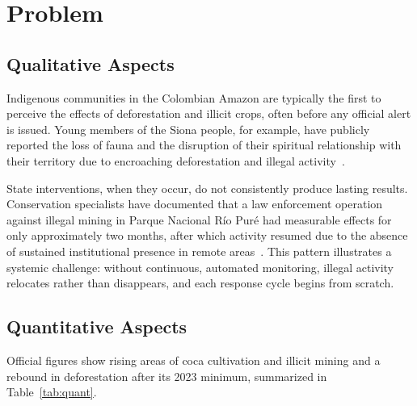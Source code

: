 \documentclass{article}
\begin{document}
\section{Problem}
\label{sec:problem}

\subsection{Qualitative Aspects}

Indigenous communities in the Colombian Amazon are typically the first to perceive
the effects of deforestation and illicit crops, often before any official alert
is issued.
Young members of the Siona people, for example, have publicly reported the loss
of fauna and the disruption of their spiritual relationship with their territory
due to encroaching deforestation and illegal activity~\cite{mongabay_siona2023}.

State interventions, when they occur, do not consistently produce lasting results.
Conservation specialists have documented that a law enforcement operation against
illegal mining in Parque Nacional Río Puré had measurable effects for only
approximately two months, after which activity resumed due to the absence of
sustained institutional presence in remote areas~\cite{mongabay_riopure2026}.
This pattern illustrates a systemic challenge: without continuous, automated
monitoring, illegal activity relocates rather than disappears, and each response
cycle begins from scratch.

\subsection{Quantitative Aspects}

Official figures show rising areas of coca cultivation and illicit mining and a rebound in deforestation after its 2023 minimum, summarized
in Table~\ref{tab:quant}.
\end{document}
